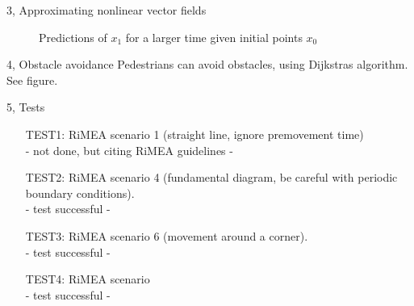 \documentclass[10pt,a4paper]{article}
\begin{document}
\begin{task}{3, Approximating nonlinear vector fields}
\begin{figure}[H]
\caption{Predictions of $x_1$ for a larger time given initial points $x_0$}
\label{fig:task3_part3}
\end{figure}

\end{task}
\begin{task}{4, Obstacle avoidance}
Pedestrians can avoid obstacles, using Dijkstras algorithm. See figure.
\end{task}
\begin{task}{5, Tests}
\begin{enumerate}
\item[TEST1:] RiMEA scenario 1 (straight line, ignore premovement time)\\
- not done, but citing RiMEA guidelines -
\item[TEST2:] RiMEA scenario 4 (fundamental diagram, be careful with periodic boundary conditions).\\
- test successful - 
\item[TEST3:] RiMEA scenario 6 (movement around a corner).\\
- test successful - 
\item[TEST4:] RiMEA scenario\\
- test successful - 
\end{enumerate}
\end{task}
\end{document}
